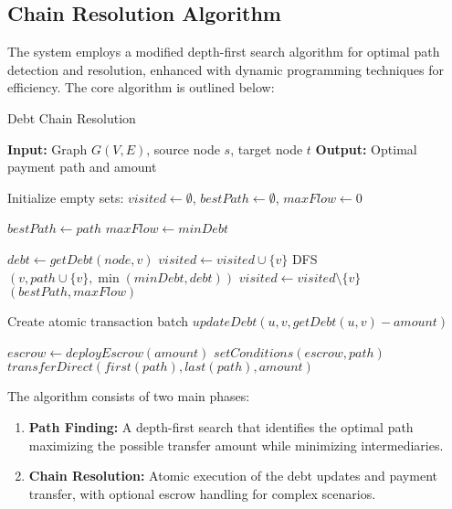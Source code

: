 \documentclass[twocolumn,10pt,a4paper]{article}
\begin{document}
\subsection{Chain Resolution Algorithm}
The system employs a modified depth-first search algorithm for optimal path detection and resolution, enhanced with dynamic programming techniques for efficiency. The core algorithm is outlined below:

\begin{algorithm}
\caption{Debt Chain Resolution}
\begin{algorithmic}[1]
\State \textbf{Input:} Graph $G(V,E)$, source node $s$, target node $t$
\State \textbf{Output:} Optimal payment path and amount

\State Initialize empty sets: $visited \gets \emptyset$, $bestPath \gets \emptyset$, $maxFlow \gets 0$

                \State $bestPath \gets path$
                \State $maxFlow \gets minDebt$
            \EndIf
            \State \Return
        \EndIf
        
                \State $debt \gets getDebt(node, v)$
                \State $visited \gets visited \cup \{v\}$
                \State DFS$(v, path \cup \{v\}, \min(minDebt, debt))$
                \State $visited \gets visited \setminus \{v\}$
            \EndIf
        \EndFor
    \EndFor
    \State \Return $(bestPath, maxFlow)$
\EndFunction

    \State Create atomic transaction batch
        \State $updateDebt(u, v, getDebt(u,v) - amount)$
    \EndFor
    
        \State $escrow \gets deployEscrow(amount)$
        \State $setConditions(escrow, path)$
    \Else
        \State $transferDirect(first(path), last(path), amount)$
    \EndIf
\EndFunction
\end{algorithmic}
\end{algorithm}

The algorithm consists of two main phases:
\begin{enumerate}
    \item \textbf{Path Finding:} A depth-first search that identifies the optimal path maximizing the possible transfer amount while minimizing intermediaries.
    \item \textbf{Chain Resolution:} Atomic execution of the debt updates and payment transfer, with optional escrow handling for complex scenarios.
\end{enumerate}
\end{document}
